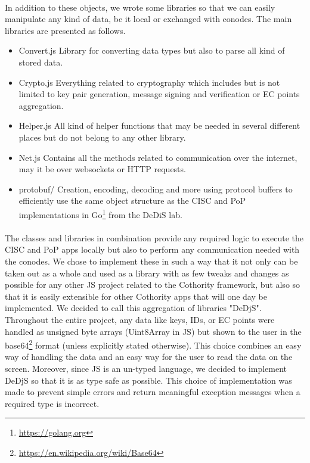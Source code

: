 \paragraph{}
In addition to these objects, we wrote some libraries so that we can easily manipulate any kind of data, be it local or exchanged with conodes. The main libraries are presented as follows.

\begin{itemize}
\item Convert.js \linebreak Library for converting data types but also to parse all kind of stored data.

\item Crypto.js \linebreak Everything related to cryptography which includes but is not limited to key pair generation, message signing and verification or EC points aggregation.

\item Helper.js \linebreak All kind of helper functions that may be needed in several different places but do not belong to any other library.

\item Net.js \linebreak Contains all the methods related to communication over the internet, may it be over websockets or HTTP requests.

\item protobuf/ \linebreak Creation, encoding, decoding and more using protocol buffers to efficiently use the same object structure as the CISC and PoP implementations in Go\footnote{\url{https://golang.org}} from the DeDiS lab.
\end{itemize}

\paragraph{}
The classes and libraries in combination provide any required logic to execute the CISC and PoP apps locally but also to perform any communication needed with the conodes. We chose to implement these in such a way that it not only can be taken out as a whole and used as a library with as few tweaks and changes as possible for any other JS project related to the Cothority framework, but also so that it is easily extensible for other Cothority apps that will one day be implemented. We decided to call this aggregation of libraries "DeDjS".
Throughout the entire project, any data like keys, IDs, or EC points were handled as unsigned byte arrays (Uint8Array in JS) but shown to the user in the base64\footnote{\url{https://en.wikipedia.org/wiki/Base64}} format (unless explicitly stated otherwise). This choice combines an easy way of handling the data and an easy way for the user to read the data on the screen. Moreover, since JS is an un-typed language, we decided to implement DeDjS so that it is as type safe as possible. This choice of implementation was made to prevent simple errors and return meaningful exception messages when a required type is incorrect.

